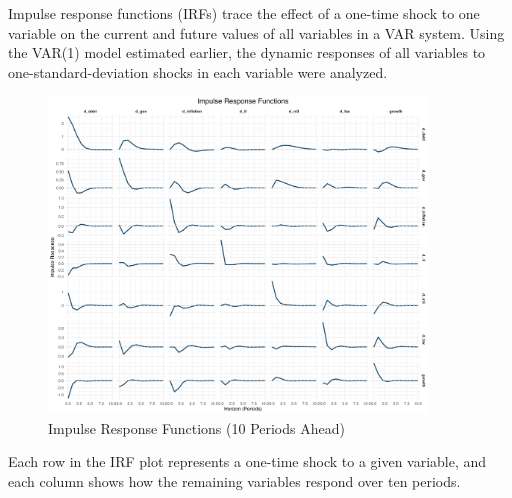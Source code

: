 \documentclass[a4paper,12pt]{article}
\begin{document}
Impulse response functions (IRFs) trace the effect of a one-time shock to one variable on the current and future values of all variables in a VAR system. Using the VAR(1) model estimated earlier, the dynamic responses of all variables to one-standard-deviation shocks in each variable were analyzed.

\begin{figure}[H]
  \centering
  \includegraphics[width=0.9\textwidth]{../results/irf_faceted_plot.png}
  \caption{Impulse Response Functions (10 Periods Ahead)}
\end{figure}

Each row in the IRF plot represents a one-time shock to a given variable, and each column shows how the remaining variables respond over ten periods.
\end{document}
